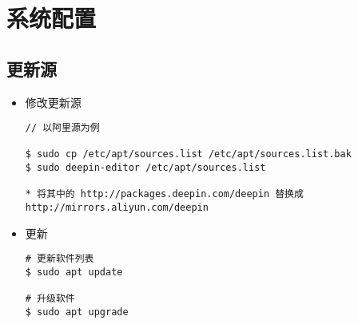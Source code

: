 \section{系统配置}
\subsection{更新源}

\begin{itemize}
\item 修改更新源
\begin{lstlisting}
// 以阿里源为例
  
$ sudo cp /etc/apt/sources.list /etc/apt/sources.list.bak  
$ sudo deepin-editor /etc/apt/sources.list

* 将其中的 http://packages.deepin.com/deepin 替换成 http://mirrors.aliyun.com/deepin 
\end{lstlisting}

\item 更新
\begin{lstlisting}
# 更新软件列表
$ sudo apt update  

# 升级软件 
$ sudo apt upgrade 
\end{lstlisting}
\end{itemize}